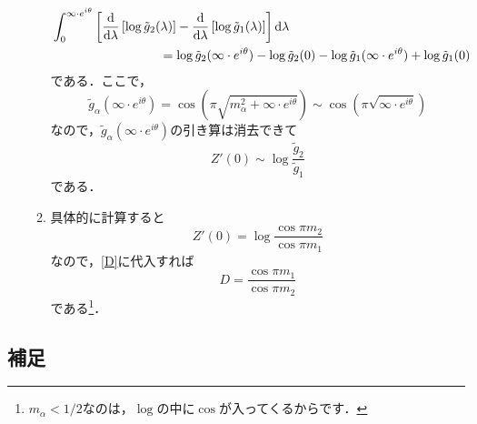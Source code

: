 \documentclass[a4paper,pdflatex,ja=standard]{bxjsarticle}
\begin{document}
\begin{enumerate}
\begin{enumerate}
\begin{align}
      &\int_{0}^{\infty\cdot e^{i\theta}}
      \left[  
        \dv{}{\lambda}\left[ \log \tilde{g}_{2}(\lambda) \right]
        -
        \dv{}{\lambda}\left[ \log \tilde{g}_{1}(\lambda) \right]
      \right]
      \dd \lambda
      \nonumber
      \\
      &\hspace{3cm}
      =
      \log \tilde{g}_{2}(\infty\cdot e^{i\theta})
      -
      \log \tilde{g}_{2}(0)
      -
      \log \tilde{g}_{1}(\infty\cdot e^{i\theta})
      +
      \log \tilde{g}_{1}(0)
    \end{align}
    である．ここで，
    \begin{equation}
      \tilde{g}_{\alpha}(\infty\cdot e^{i\theta})
      =
      \cos(\pi\sqrt{m_{\alpha}^2+\infty\cdot e^{i\theta}})
      \sim
      \cos\left( \pi\sqrt{\infty\cdot e^{i\theta}}  \right)
      \label{g_alpha}
    \end{equation}
    なので，$\tilde{g}_{\alpha}(\infty\cdot e^{i\theta})$の引き算は消去できて
    \begin{equation}
      Z'(0)
      \sim
      \log \frac{\tilde{g}_{2}}{\tilde{g}_{1}}
    \end{equation}
    である．

    \item 
    具体的に計算すると
    \begin{equation}
      Z'(0)
      =
      \log
      \frac{\cos \pi m_{2}}{\cos \pi m_{1}}
    \end{equation}
    なので，\eqref{D}に代入すれば
    \begin{equation}
      D
      =
      \frac{\cos \pi m_{1}}{\cos \pi m_{2}}
    \end{equation}
    である\footnote{$m_{\alpha}<1/2$なのは，$\log$の中に$\cos$が入ってくるからです．}．
    
  \end{enumerate}
\end{enumerate}

\subsection*{補足}
\end{document}
